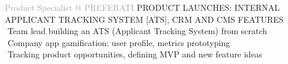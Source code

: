 \begin{cvtable}
% 
{\textcolor{darkgray}{%
Product Specialist \newline
@ {P\scriptsize REFERATI}
}}%
{}%
{%
    {\scriptsize PRODUCT LAUNCHES:
    INTERNAL APPLICANT TRACKING SYSTEM [ATS],
    CRM AND CMS FEATURES
    } \\
     \textperiodcentered $ $ Team lead building an ATS (Applicant Tracking System) from scratch \\
     \textperiodcentered $ $ Company app gamification: user profile, metrics prototyping \\
     \textperiodcentered $ $ Tracking product opportunities, defining MVP and new feature ideas \\
%
}


\end{cvtable}
